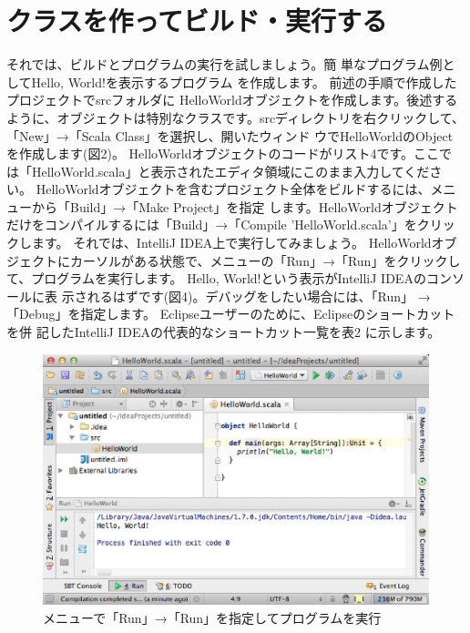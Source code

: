 \documentclass[10pt]{jarticle}
\begin{document}
\section{クラスを作ってビルド・実行する}
それでは、ビルドとプログラムの実行を試しましょう。簡 単なプログラム例としてHello, World!を表示するプログラム を作成します。 前述の手順で作成したプロジェクトでsrcフォルダに HelloWorldオブジェクトを作成します。後述するように、オブジェクトは特別なクラスです。srcディレクトリを右クリックして、「New」→「Scala Class」を選択し、開いたウィンド ウでHelloWorldのObjectを作成します(図2)。 HelloWorldオブジェクトのコードがリスト4です。ここで は「HelloWorld.scala」と表示されたエディタ領域にこのまま入力してください。 HelloWorldオブジェクトを含むプロジェクト全体をビルドするには、メニューから「Build」→「Make Project」を指定 します。HelloWorldオブジェクトだけをコンパイルするには「Build」→「Compile 'HelloWorld.scala'」をクリックします。 それでは、IntelliJ IDEA上で実行してみましょう。 HelloWorldオブジェクトにカーソルがある状態で、メニューの「Run」→「Run」をクリックして、プログラムを実行します。 Hello, World!という表示がIntelliJ IDEAのコンソールに表 示されるはずです(図4)。デバッグをしたい場合には、「Run」 →「Debug」を指定します。 Eclipseユーザーのために、Eclipseのショートカットを併 記したIntelliJ IDEAの代表的なショートカット一覧を表2 に示します。

\begin{figure}[h]
  \centering
  \caption{メニューで「Run」→「Run」を指定してプログラムを実行}
  \includegraphics[scale=0.5]{img/intellij.eps}
\end{figure}
\end{document}
